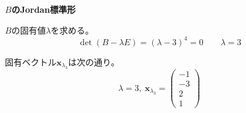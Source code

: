 \documentclass[12pt,b5paper]{ltjsarticle}
\begin{document}
\dotfill
\textbf{$B$のJordan標準形}
\dotfill

$B$の固有値$\lambda$を求める。
\begin{equation}
 \det(B-\lambda E)=(\lambda-3)^4=0
  \qquad \lambda=3
\end{equation}

固有ベクトル$\bm{x}_{\lambda_3}$は次の通り。
\begin{equation}
 \lambda =3 ,\ \bm{x}_{\lambda_3}=\begin{pmatrix}-1\\-3\\2\\1\end{pmatrix}
\end{equation}
\end{document}
